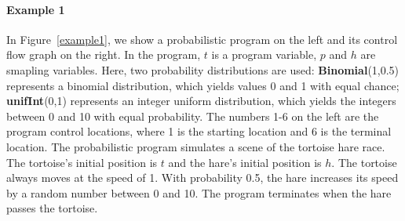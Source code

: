 \documentclass[sigconf,review, anonymous]{acmart}
\begin{document}
\paragraph{Example 1} In Figure~\ref{example1}, we show a probabilistic program on the left and its control flow graph on the right. In the program,  $t$ is a program variable,  $p$ and $h$ are smapling variables. Here, two probability distributions are used: \textbf{Binomial}(1,0.5) represents a binomial distribution, which yields values 0 and 1 with equal chance; \textbf{unifInt}(0,1) represents an integer uniform distribution, which yields the integers between 0 and 10  with equal probability. The numbers 1-6 on the left are the program control locations, where 1 is the starting location and 6 is the terminal location. The probabilistic program simulates a scene of the tortoise hare race. The tortoise's initial position is $t$ and the hare's initial position is $h$.  The tortoise  always moves at the speed of 1. With probability 0.5, the hare increases its speed by a random number between 0 and 10. The program terminates when the hare passes the tortoise.
\end{document}
